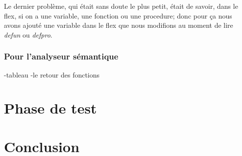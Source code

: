 ﻿\documentclass[10pt,a4paper]{article}
\begin{document}
Le dernier problème, qui était sans doute le plus petit, était de savoir, dans le flex, si on a une variable, une fonction ou une procedure; donc pour ça nous avons ajouté une variable dans le flex que nous modifions au moment de lire \textit{defun} ou \textit{defpro}.
\subsubsection {Pour l'analyseur sémantique}
-tableau\newline
-le retour des fonctions\newline


\section{Phase de test}


\newpage
\section{Conclusion}
\end{document}
